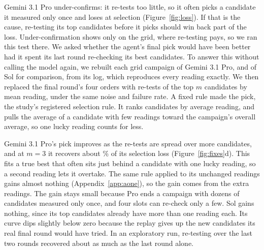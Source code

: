 Gemini 3.1 Pro under-confirms: it re-tests too little, so it often picks a candidate it measured only once and loses at selection (Figure~\ref{fig:loss}). If that is the cause, re-testing its top candidates before it picks should win back part
of the loss. Under-confirmation shows only on the grid, where re-testing pays, so we ran this test there. We asked whether the agent's final pick would have been better had it spent its last round re-checking its best candidates. To answer this without calling the model again, we rebuilt each grid campaign of Gemini 3.1 Pro, and of Sol for comparison, from its log,
which reproduces every reading exactly. We then replaced the final round's four orders with re-tests of the top $m$
candidates by mean reading, under the same noise and failure rate. A fixed rule made the pick, the study's registered selection rule. It ranks
candidates by average reading, and pulls the average of a candidate with few readings toward the campaign's overall
average, so one lucky reading counts for less.

Gemini 3.1 Pro's pick improves as the re-tests are spread over more candidates, and at $m = 3$ it recovers about
\nAoneProRecoveredKthree\% of its selection loss (Figure~\ref{fig:fixes}d). This fits a true best that often sits just behind
a candidate with one lucky reading, so a second reading lets it overtake. The same rule applied to its unchanged readings gains almost nothing (Appendix~\ref{app:aone}), so the gain comes
from the extra readings. The gain stays small because Pro ends a campaign with
dozens of candidates measured only once, and four slots can re-check only a few. Sol gains nothing, since its top
candidates already have more than one reading each. Its curve dips slightly below zero because the replay gives up the new
candidates its real final round would have tried. In an exploratory run, re-testing over the last two rounds
recovered about as much as the last round alone.

